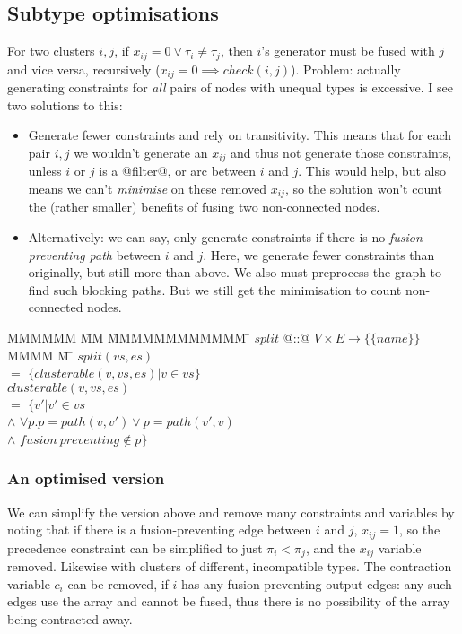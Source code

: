 \subsection{Subtype optimisations}
For two clusters $i, j$, if $x_{ij} = 0 \vee \tau_i \not= \tau_j$, then $i$'s generator must be fused with $j$ and vice versa, recursively ($x_{ij} = 0 \implies check(i,j)$).
Problem: actually generating constraints for \emph{all} pairs of nodes with unequal types is excessive.
I see two solutions to this:
\begin{itemize}
\item
Generate fewer constraints and rely on transitivity.
This means that for each pair $i,j$ we wouldn't generate an $x_{ij}$ and thus not generate those constraints, unless $i$ or $j$ is a @filter@, or arc between $i$ and $j$.
This would help, but also means we can't \emph{minimise} on these removed $x_{ij}$, so the solution won't count the (rather smaller) benefits of fusing two non-connected nodes.
\item
Alternatively:
we can say, only generate constraints if there is no \emph{fusion preventing path} between $i$ and $j$.
Here, we generate fewer constraints than originally, but still more than above.
We also must preprocess the graph to find such blocking paths.
But we still get the minimisation to count non-connected nodes.
\end{itemize}

\begin{tabbing}
MMMMMM      \= MM   \=  MMMMMMMMMMMM    \=  \kill
$split$     \> @::@ \> $V \times E \to \{ \{name\} \}$      \\
MMMM        \= M    \= \kill
$split(vs,es)$ \\
    \> $=$  \> $\{clusterable(v,vs,es) | v \in vs\}$      \\
$clusterable(v,vs,es)$  \\
    \>$=$       \>$\{v' | v' \in vs$                                \\
    \>$\wedge$  \>$\forall p. p = path(v,v') \vee p = path(v',v)$   \\
    \>$\wedge$  \>$fusion~preventing \not\in p\}$\\
\end{tabbing}

\subsubsection{An optimised version}
We can simplify the version above and remove many constraints and variables by noting that if there is a fusion-preventing edge between $i$ and $j$, $x_{ij} = 1$, so the precedence constraint can be simplified to just $\pi_i < \pi_j$, and the $x_{ij}$ variable removed.
Likewise with clusters of different, incompatible types.
The contraction variable $c_i$ can be removed, if $i$ has any fusion-preventing output edges: any such edges use the array and cannot be fused, thus there is no possibility of the array being contracted away.

